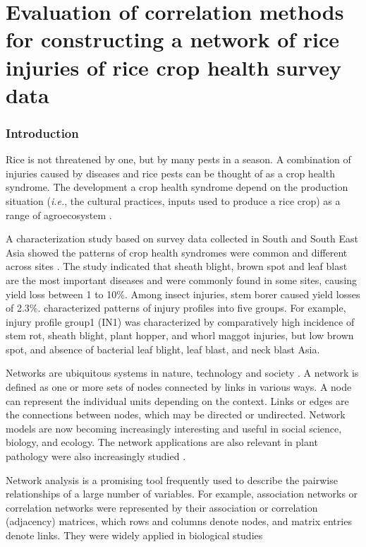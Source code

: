 \chapter{Evaluation of correlation methods for constructing a network of rice injuries of rice crop health survey data}
\subsection{Introduction}

Rice is not threatened by one, but by many pests in a season. A combination of injuries caused by diseases and rice pests can be thought of as a crop health syndrome. The development a crop health syndrome depend on the production situation (\textit{i.e.}, the cultural practices, inputs used to produce a rice crop) as a range of agroecosystem \citep{Savary_2006_Quantification}.

A characterization study based on survey data collected in South and South East Asia showed the patterns of crop health syndromes were common and different across sites \citep{Savary_2000_Characterization}. The study indicated that sheath blight, brown spot and leaf blast are the most important diseases and were commonly found in some sites, causing yield loss between 1 to 10\%. Among insect injuries, stem borer caused yield losses of 2.3\%. \citet{Savary_2000_Characterization} characterized patterns of injury profiles into five groups. For example, injury profile group1 (IN1) was characterized by comparatively high incidence of stem rot, sheath blight, plant hopper, and whorl maggot injuries, but low brown spot, and absence of bacterial leaf blight, leaf blast, and neck blast Asia.

Networks are ubiquitous systems in nature, technology and society \citep{Newman_2010_Networks}. A network is defined as one or more sets of nodes connected by links in various ways. A node can represent the individual units depending on the context. Links or edges are the connections between nodes, which may be directed or undirected. Network models are now becoming increasingly interesting and useful in social science, biology, and ecology. The network applications  are also relevant in plant pathology were also increasingly studied \citep{Moslonka_Lefebvre_2011}.

Network analysis is a promising tool frequently used to describe the pairwise relationships of a large number of variables. For example, association networks or correlation networks were represented by their association or correlation (adjacency) matrices, which rows and columns denote nodes, and matrix entries denote links. They were widely applied in biological studies \citep{Toubiana_2013_Net, Barabasi_2004_Network}

